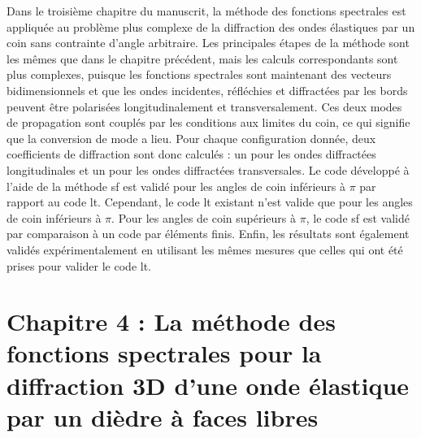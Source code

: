 Dans le troisième chapitre du manuscrit, la méthode des fonctions spectrales est appliquée au problème plus complexe de la diffraction des ondes élastiques par un coin sans contrainte d'angle arbitraire. Les principales étapes de la méthode sont les mêmes que dans le chapitre précédent, mais les calculs correspondants sont plus complexes, puisque les fonctions spectrales sont maintenant des vecteurs bidimensionnels et que les ondes incidentes, réfléchies et diffractées par les bords peuvent être polarisées longitudinalement et transversalement. Ces deux modes de propagation sont couplés par les conditions aux limites du coin, ce qui signifie que la conversion de mode a lieu. Pour chaque configuration donnée, deux coefficients de diffraction sont donc calculés : un pour les ondes diffractées longitudinales et un pour les ondes diffractées transversales. Le code développé à l'aide de la méthode \acrfull{sf} est validé pour les angles de coin inférieurs à $\pi$ par rapport au code \acrfull{lt}. Cependant, le code \acrshort{lt} existant n'est valide que pour les angles de coin inférieurs à $\pi$. Pour les angles de coin supérieurs à $\pi$, le code \acrshort{sf} est validé par comparaison à un code par éléments finis. Enfin, les résultats sont également validés expérimentalement en utilisant les mêmes mesures que celles qui ont été prises pour valider le code \acrshort{lt}.

\section[Résumé de la thèse en français]{Chapitre 4 : La méthode des fonctions spectrales pour la diffraction 3D d'une onde élastique par un dièdre à faces libres}

